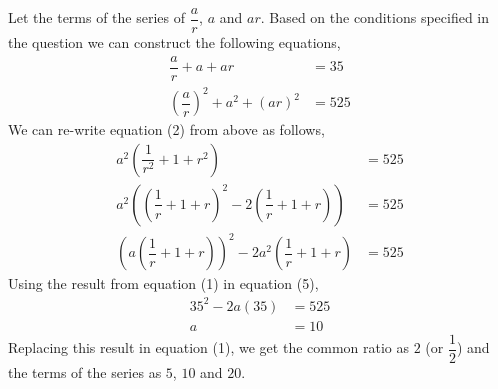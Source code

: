 \begin{solution}
  Let the terms of the series of $\dfrac{a}{r}$, $a$ and $ar$. Based on the conditions specified in the question we can construct the following equations,
  \begin{align}
    \dfrac{a}{r} + a + ar           &= 35 \\
    (\dfrac{a}{r})^2 + a^2 + (ar)^2 &= 525
  \end{align}
  We can re-write equation (2) from above as follows,
  \begin{align}
    a^2(\dfrac{1}{r^2} + 1 + r^2)                            &= 525 \\
    a^2((\dfrac{1}{r} + 1 + r)^2 - 2(\dfrac{1}{r} + 1 + r))  &= 525 \\
    (a(\dfrac{1}{r} + 1 + r))^2 - 2a^2(\dfrac{1}{r} + 1 + r) &= 525
  \end{align}  
  Using the result from equation (1) in equation (5),
  \begin{align}
    35^2 - 2a(35) &= 525 \\
    a             &= 10
  \end{align}
  Replacing this result in equation (1), we get the common ratio as $2$ (or $\dfrac{1}{2}$) and the terms of the series as $5$, $10$ and $20$.
  
\end{solution}

